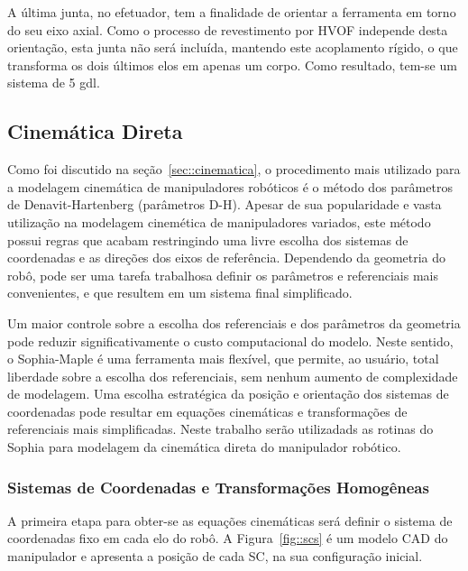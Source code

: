 A última junta, no efetuador, tem a finalidade de orientar a ferramenta em torno
do seu eixo axial. Como o processo de revestimento por HVOF independe desta
orientação, esta junta não será incluída, mantendo este acoplamento rígido, o
que transforma os dois últimos elos em apenas um corpo.
Como resultado, tem-se um sistema de 5 gdl.


\subsection{Cinemática Direta}\label{sec::dkin}

Como foi discutido na seção~\ref{sec::cinematica}, o procedimento mais utilizado
para a modelagem cinemática de manipuladores robóticos é o método dos parâmetros
de Denavit-Hartenberg (parâmetros D-H). Apesar de sua popularidade e vasta
utilização na modelagem cinemética de manipuladores variados, este método possui
regras que acabam restringindo uma livre escolha dos sistemas de coordenadas e
as direções dos eixos de referência. Dependendo da geometria do robô, pode ser
uma tarefa trabalhosa definir os parâmetros e referenciais mais convenientes, e
que resultem em um sistema final simplificado.

Um maior controle sobre a escolha dos referenciais e dos parâmetros da geometria
pode reduzir significativamente o custo computacional do modelo.
Neste sentido, o Sophia-Maple é uma ferramenta mais flexível, que permite, ao
usuário, total liberdade sobre a escolha dos referenciais, sem nenhum aumento de
complexidade de modelagem. Uma escolha estratégica da posição e orientação dos
sistemas de coordenadas pode resultar em equações cinemáticas e transformações de
referenciais mais simplificadas. Neste trabalho serão utilizadads as rotinas do
Sophia para modelagem da cinemática direta do manipulador robótico.

\subsubsection{Sistemas de Coordenadas e Transformações Homogêneas}

A primeira etapa para obter-se as equações cinemáticas será definir o sistema de
coordenadas fixo em cada elo do robô. A Figura~\ref{fig::scs} é um modelo CAD do
manipulador e apresenta a posição de cada SC, na sua configuração inicial.

